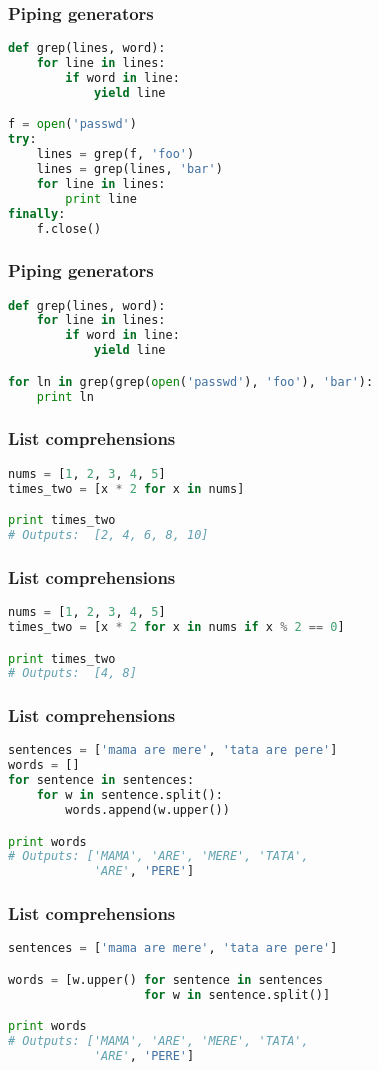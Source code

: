 \documentclass{beamer}
\begin{document}
\begin{frame}[fragile]
\frametitle{Piping generators}
\begin{lstlisting}[language=python]
def grep(lines, word):
    for line in lines:
        if word in line:
            yield line

f = open('passwd')
try:
    lines = grep(f, 'foo')
    lines = grep(lines, 'bar')
    for line in lines:
        print line
finally:
    f.close()
\end{lstlisting}
\end{frame}

\begin{frame}[fragile]
\frametitle{Piping generators}
\begin{lstlisting}[language=python]
def grep(lines, word):
    for line in lines:
        if word in line:
            yield line

for ln in grep(grep(open('passwd'), 'foo'), 'bar'):
    print ln
\end{lstlisting}

\end{frame}

\begin{frame}[fragile]
\frametitle{List comprehensions}
\begin{lstlisting}[language=python]
nums = [1, 2, 3, 4, 5]
times_two = [x * 2 for x in nums]

print times_two
# Outputs:  [2, 4, 6, 8, 10]
\end{lstlisting}
\end{frame}

\begin{frame}[fragile]
\frametitle{List comprehensions}
\begin{lstlisting}[language=python]
nums = [1, 2, 3, 4, 5]
times_two = [x * 2 for x in nums if x % 2 == 0]

print times_two
# Outputs:  [4, 8]
\end{lstlisting}
\end{frame}

\begin{frame}[fragile]
\frametitle{List comprehensions}
\begin{lstlisting}[language=python]
sentences = ['mama are mere', 'tata are pere']
words = []
for sentence in sentences:
    for w in sentence.split():
        words.append(w.upper())

print words
# Outputs: ['MAMA', 'ARE', 'MERE', 'TATA',
            'ARE', 'PERE']

\end{lstlisting}
\end{frame}

\begin{frame}[fragile]
\frametitle{List comprehensions}
\begin{lstlisting}[language=python]
sentences = ['mama are mere', 'tata are pere']

words = [w.upper() for sentence in sentences
                   for w in sentence.split()]

print words
# Outputs: ['MAMA', 'ARE', 'MERE', 'TATA',
            'ARE', 'PERE']
\end{lstlisting}
\end{frame}
\end{document}
